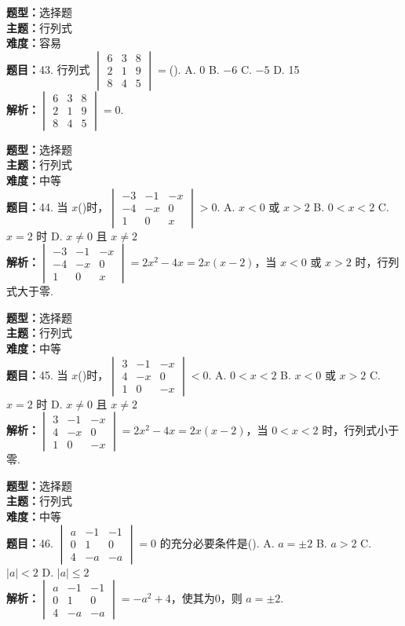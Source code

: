 \documentclass{ctexart}
\newenvironment{question}[5]{%
	\noindent\textbf{题型：}#1\\
	\textbf{主题：}#2\\
	\textbf{难度：}#3\\
	\textbf{题目：}#4\\
	\textbf{解析：}#5\\
	\vspace{1em}
}{}
\begin{document}
	\begin{question}
		{选择题}
		{行列式}
		{容易}
		{43. 行列式 \(\begin{vmatrix} 6 & 3 & 8 \\ 2 & 1 & 9 \\ 8 & 4 & 5\end{vmatrix}=\)(\qquad). 
			A. 0 \quad B. \(-6\) \quad C. \(-5\) \quad D. 15}
		{\(\begin{vmatrix} 6 & 3 & 8 \\ 2 & 1 & 9 \\ 8 & 4 & 5\end{vmatrix}=0\). }
	\end{question}
	
	\begin{question}
		{选择题}
		{行列式}
		{中等}
		{44. 当 \(x\)(\qquad)时，\(\begin{vmatrix} -3 & -1 & -x \\ -4 & -x & 0 \\ 1 & 0 & x\end{vmatrix}>0\). 
			A. \(x<0\) 或 \(x>2\) \quad B. \(0<x<2\) \quad C. \(x=2\) 时 \quad D. \(x\neq0\) 且 \(x\neq2\)}
		{\(\begin{vmatrix} -3 & -1 & -x \\ -4 & -x & 0 \\ 1 & 0 & x\end{vmatrix}=2x^2 - 4x = 2x(x - 2)\)，当 \(x<0\) 或 \(x>2\) 时，行列式大于零. }
	\end{question}
	
	\begin{question}
		{选择题}
		{行列式}
		{中等}
		{45. 当 \(x\)(\qquad)时，\(\begin{vmatrix} 3 & -1 & -x \\ 4 & -x & 0 \\ 1 & 0 & -x\end{vmatrix}<0\). 
			A. \(0<x<2\) \quad B. \(x<0\) 或 \(x>2\) \quad C. \(x=2\) 时 \quad D. \(x\neq0\) 且 \(x\neq2\)}
		{\(\begin{vmatrix} 3 & -1 & -x \\ 4 & -x & 0 \\ 1 & 0 & -x\end{vmatrix}=2x^2 - 4x = 2x(x - 2)\)，当 \(0<x<2\) 时，行列式小于零. }
	\end{question}
	
	\begin{question}
		{选择题}
		{行列式}
		{中等}
		{46. \(\begin{vmatrix} a & -1 & -1 \\ 0 & 1 & 0 \\ 4 & -a & -a\end{vmatrix}=0\) 的充分必要条件是(\qquad). 
			A. \(a=\pm2\) \quad B. \(a>2\) \quad C. \(|a|<2\) \quad D. \(|a|\leq2\)}
		{\(\begin{vmatrix} a & -1 & -1 \\ 0 & 1 & 0 \\ 4 & -a & -a\end{vmatrix} = -a^2 + 4\)，使其为0，则 \(a=\pm2\). }
	\end{question}
	
\end{document}
